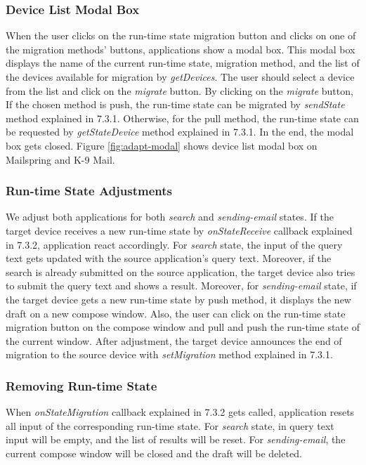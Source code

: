 \subsubsection{Device List Modal Box}
When the user clicks on the run-time state migration button and clicks on one of the migration methods' buttons, applications show a modal box. This modal box displays the name of the current run-time state, migration method, and the list of the devices available for migration by \textit{getDevices}. The user should select a device from the list and click on the \textit{migrate} button. By clicking on the \textit{migrate} button, If the chosen method is push, the run-time state can be migrated by \textit{sendState} method explained in 7.3.1. Otherwise, for the pull method, the run-time state can be requested by \textit{getStateDevice} method explained in 7.3.1. In the end, the modal box gets closed. Figure \ref{fig:adapt-modal} shows device list modal box on Mailspring and K-9 Mail.

\subsubsection{Run-time State Adjustments}
We adjust both applications for both \textit{search} and \textit{sending-email} states. If the target device receives a new run-time state by \textit{onStateReceive} callback explained in 7.3.2, application react accordingly. For \textit{search} state, the input of the query text gets updated with the source application's query text. Moreover, if the search is already submitted on the source application, the target device also tries to submit the query text and shows a result. Moreover, for \textit{sending-email} state, if the target device gets a new run-time state by push method, it displays the new draft on a new compose window. Also, the user can click on the run-time state migration button on the compose window and pull and push the run-time state of the current window. After adjustment, the target device announces the end of migration to the source device with \textit{setMigration} method explained in 7.3.1.

\subsubsection{Removing Run-time State}
When \textit{onStateMigration} callback explained in 7.3.2 gets called, application resets all input of the corresponding run-time state. For \textit{search} state, in query text input will be empty, and the list of results will be reset. For \textit{sending-email}, the current compose window will be closed and the draft will be deleted.

